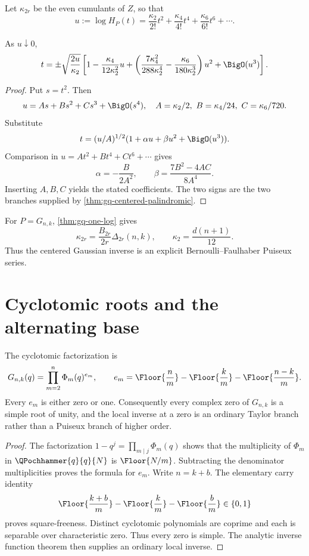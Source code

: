 Let \(\kappa_{2r}\) be the even cumulants of \(Z\), so that
\[
  u:=\log H_P(t)
  =\frac{\kappa_2}{2!}t^2
   +\frac{\kappa_4}{4!}t^4
   +\frac{\kappa_6}{6!}t^6+\cdots.
\]

\begin{proposition}
\label{prop:gq-centered-puiseux}
As \(u\downarrow0\),
\[
  t=\pm\sqrt{\frac{2u}{\kappa_2}}
  \left[
    1-\frac{\kappa_4}{12\kappa_2^2}u
    +\left(
       \frac{7\kappa_4^2}{288\kappa_2^4}
       -\frac{\kappa_6}{180\kappa_2^3}
     \right)u^2
    +\BigO(u^3)
  \right].
\]
\end{proposition}

\begin{proof}
Put \(s=t^2\).  Then
\[
  u=As+Bs^2+Cs^3+\BigO(s^4),
  \quad
  A=\kappa_2/2,\ B=\kappa_4/24,\ C=\kappa_6/720.
\]
Substitute
\[
  t=(u/A)^{1/2}(1+\alpha u+\beta u^2+\BigO(u^3)).
\]
Comparison in \(u=At^2+Bt^4+Ct^6+\cdots\) gives
\[
  \alpha=-\frac{B}{2A^2},
  \qquad
  \beta=\frac{7B^2-4AC}{8A^4}.
\]
Inserting \(A,B,C\) yields the stated coefficients.  The two signs are the
two branches supplied by \cref{thm:gq-centered-palindromic}.
\end{proof}

For \(P=G_{n,k}\), \cref{thm:gq-one-log} gives
\[
  \kappa_{2r}
  =\frac{B_{2r}}{2r}\Delta_{2r}(n,k),
  \qquad
  \kappa_2=\frac{d(n+1)}{12}.
\]
Thus the centered Gaussian inverse is an explicit
Bernoulli--Faulhaber Puiseux series.

\section{Cyclotomic roots and the alternating base}
\label{sec:gaussian-cyclotomic}

\begin{theorem}
\label{thm:gq-square-free}
The cyclotomic factorization is
\[
  G_{n,k}(q)=\prod_{m=2}^{n}\Phi_m(q)^{e_m},
  \qquad
  e_m=\Floor{\frac nm}
      -\Floor{\frac km}
      -\Floor{\frac{n-k}{m}}.
\]
Every \(e_m\) is either zero or one.  Consequently every complex zero of
\(G_{n,k}\) is a simple root of unity, and the local inverse at a zero is an
ordinary Taylor branch rather than a Puiseux branch of higher order.
\end{theorem}

\begin{proof}
The factorization \(1-q^j=\prod_{m\mid j}\Phi_m(q)\) shows that the
multiplicity of \(\Phi_m\) in \(\QPochhammer{q}{q}{N}\) is
\(\Floor{N/m}\).
Subtracting the denominator multiplicities proves the formula for \(e_m\).
Write \(n=k+b\).  The elementary carry identity
\[
  \Floor{\frac{k+b}{m}}
  -\Floor{\frac{k}{m}}
  -\Floor{\frac{b}{m}}\in\{0,1\}
\]
proves square-freeness.  Distinct cyclotomic polynomials are coprime and each
is separable over characteristic zero.  Thus every zero is simple.  The
analytic inverse function theorem then supplies an ordinary local inverse.
\end{proof}

